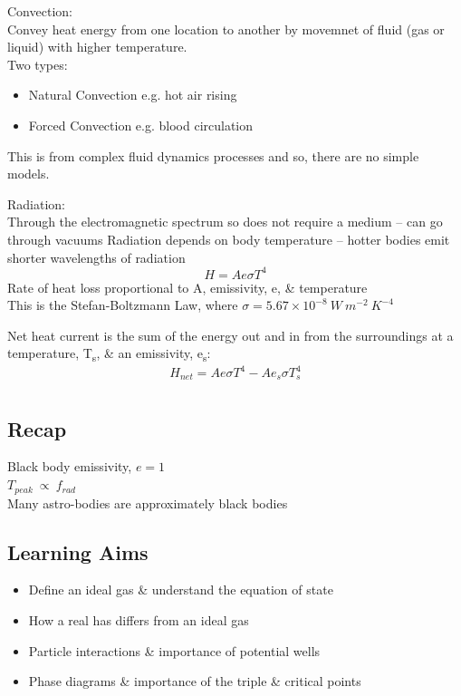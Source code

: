 \documentclass[a4paper, 11pt, fleqn, normalem]{report}
\begin{document}
Convection: \\
Convey heat energy from one location to another by movemnet of fluid (gas or liquid) with higher temperature. \\
Two types:
\begin{itemize}
	\item Natural Convection e.g. hot air rising
	\item Forced Convection e.g. blood circulation
\end{itemize}
This is from complex fluid dynamics processes and so, there are no simple models.

Radiation: \\
Through the electromagnetic spectrum so does not require a medium -- can go through vacuums
Radiation depends on body temperature -- hotter bodies emit shorter wavelengths of radiation
\begin{equation*}
	H = Ae{\sigma}T^{4}
\end{equation*}
Rate of heat loss proportional to A, emissivity, e, \& temperature \\
This is the Stefan-Boltzmann Law, where $\sigma = 5.67\times10^{-8}~W~m^{-2}~K^{-4}$

Net heat current is the sum of the energy out and in from the surroundings at a temperature, T\textsubscript{s}, \& an emissivity, e\textsubscript{s}:
\begin{equation*}
	H_{net} = Ae{\sigma}T^{4} - Ae_{s}{\sigma}T^{4}_{s}
\end{equation*}

\chapter{}
\thispagestyle{fancy}
\section{Recap}
Black body emissivity, $e = 1$ \\
$T_{peak} ~\propto~f_{rad}$ \\
Many astro-bodies are approximately black bodies

\section{Learning Aims}
\begin{itemize}
	\item Define an ideal gas \& understand the equation of state
	\item How a real has differs from an ideal gas
	\item Particle interactions \& importance of potential wells
	\item Phase diagrams \& importance of the triple \& critical points
\end{itemize}
\end{document}
